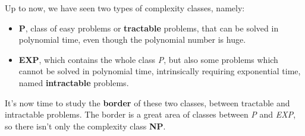 Up to now, we have seen two types of complexity classes, namely:
\begin{itemize}
    \renewcommand{\labelitemi}{-}
    \item \textbf{P}, class of easy problems or \textbf{tractable} problems, that can be solved in polynomial time, even though the polynomial number is huge.
    \item \textbf{EXP}, which contains the whole class \textit{P}, but also some problems which cannot be solved in polynomial time, intrinsically requiring exponential time, named \textbf{intractable} problems.
\end{itemize}
It's now time to study the \textbf{border} of these two classes, between tractable and intractable problems. The border is a great area of classes between
\textit{P} and \textit{EXP}, so there isn't only the complexity class \textbf{NP}.